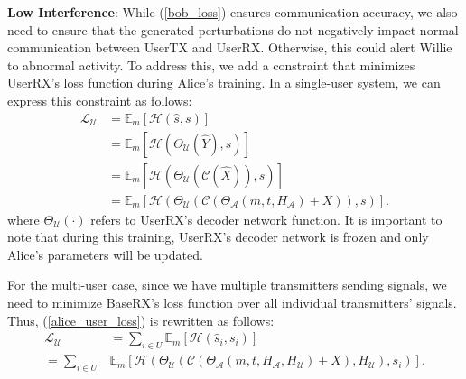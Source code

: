 
\textbf{Low Interference}: While (\ref{bob_loss}) ensures communication accuracy, we also need to ensure that the generated perturbations do not negatively impact normal communication between UserTX and UserRX. Otherwise, this could alert Willie to abnormal activity. To address this, we add a constraint that minimizes UserRX's loss function during Alice's training. In a single-user system, we can express this constraint as follows:
\begin{equation}
	\begin{aligned} \label{alice_user_loss}
	\mathcal{L}_{\mathcal{U}} & = \mathbb{E}_{m}[\mathcal{H}(\hat{s}, s)] \\
	& = \mathbb{E}_{m}[\mathcal{H}(\Theta_{\mathcal{U}}(\hat{Y}), s)] \\
	& = \mathbb{E}_{m}[\mathcal{H}(\Theta_{\mathcal{U}}(\mathcal{C}(\hat{X})), s)] \\
	& = \mathbb{E}_{m}[\mathcal{H}(\Theta_{\mathcal{U}}(\mathcal{C}(\Theta_{\mathcal{A}}(m, t, H_{\mathcal{A}}) + X)), s)].
	\end{aligned}
\end{equation}
where \(\Theta_{\mathcal{U}}(\cdot)\) refers to UserRX's decoder network function. It is important to note that during this training, UserRX's decoder network is frozen and only Alice's parameters will be updated.

For the multi-user case, since we have multiple transmitters sending signals, we need to minimize BaseRX's loss function over all individual transmitters' signals. Thus, (\ref{alice_user_loss}) is rewritten as follows:
\begin{equation}
	\begin{aligned} \label{multi_alice_user_loss}
		\mathcal{L}_{\mathcal{U}} & = \sum_{i \in U}\mathbb{E}_{m}[\mathcal{H}(\hat{s}_i, s_i)] \\
		= \sum_{i \in U} & 
			\mathbb{E}_{m}[\mathcal{H}
			(\Theta_{\mathcal{U}}(\mathcal{C}(\Theta_{\mathcal{A}}(m, t, H_{\mathcal{A}}, H_{\mathcal{U}}) + X),  H_{\mathcal{U}}), s_i)].
	\end{aligned}
\end{equation}

